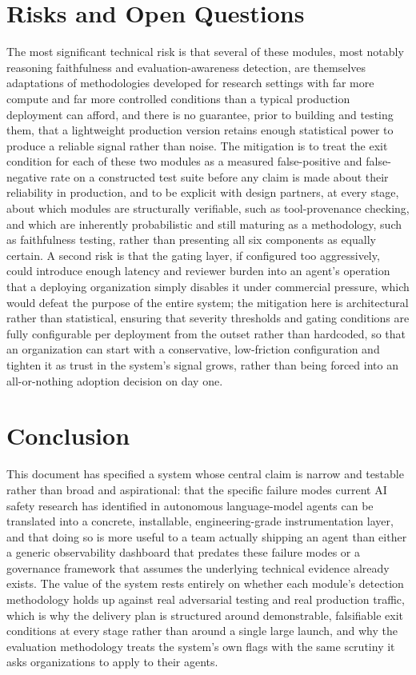 \documentclass[11pt,a4paper]{article}
\begin{document}
\section{Risks and Open Questions}

The most significant technical risk is that several of these modules, most notably reasoning faithfulness and evaluation-awareness detection, are themselves adaptations of methodologies developed for research settings with far more compute and far more controlled conditions than a typical production deployment can afford, and there is no guarantee, prior to building and testing them, that a lightweight production version retains enough statistical power to produce a reliable signal rather than noise. The mitigation is to treat the exit condition for each of these two modules as a measured false-positive and false-negative rate on a constructed test suite before any claim is made about their reliability in production, and to be explicit with design partners, at every stage, about which modules are structurally verifiable, such as tool-provenance checking, and which are inherently probabilistic and still maturing as a methodology, such as faithfulness testing, rather than presenting all six components as equally certain. A second risk is that the gating layer, if configured too aggressively, could introduce enough latency and reviewer burden into an agent's operation that a deploying organization simply disables it under commercial pressure, which would defeat the purpose of the entire system; the mitigation here is architectural rather than statistical, ensuring that severity thresholds and gating conditions are fully configurable per deployment from the outset rather than hardcoded, so that an organization can start with a conservative, low-friction configuration and tighten it as trust in the system's signal grows, rather than being forced into an all-or-nothing adoption decision on day one.

\section{Conclusion}

This document has specified a system whose central claim is narrow and testable rather than broad and aspirational: that the specific failure modes current AI safety research has identified in autonomous language-model agents can be translated into a concrete, installable, engineering-grade instrumentation layer, and that doing so is more useful to a team actually shipping an agent than either a generic observability dashboard that predates these failure modes or a governance framework that assumes the underlying technical evidence already exists. The value of the system rests entirely on whether each module's detection methodology holds up against real adversarial testing and real production traffic, which is why the delivery plan is structured around demonstrable, falsifiable exit conditions at every stage rather than around a single large launch, and why the evaluation methodology treats the system's own flags with the same scrutiny it asks organizations to apply to their agents.
\end{document}
